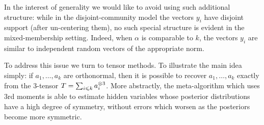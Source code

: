 In the interest of generality we would like to avoid using such additional structure: while in the disjoint-community model the vectors $y_i$ have disjoint support (after un-centering them), no such special structure is evident in the mixed-membership setting.
Indeed, when $\alpha$ is comparable to $k$, the vectors $y_i$ are similar to independent random vectors of the appropriate norm.

To address this issue we turn to tensor methods.
To illustrate the main idea simply: if $a_1,\ldots,a_k$ are orthonormal, then it is possible to recover $a_1,\ldots,a_k$ exactly from the $3$-tensor $T = \sum_{i \leqslant k} a_i^{\otimes 3}$.
More abstractly, the meta-algorithm which uses $3$rd moments is able to estimate hidden variables whose posterior distributions have a high degree of symmetry, without errors which worsen as the posteriors become more symmetric.

